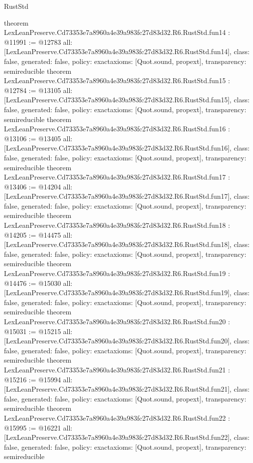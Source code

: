 \begin{lexlean}{RustStd}
\begin{coremodule}
{}
theorem LexLeanPreserve.Cd73353e7a8960a4e39a983fc27d83d32.R6.RustStd.fun14 : @11991 := @12783 {
  all: [LexLeanPreserve.Cd73353e7a8960a4e39a983fc27d83d32.R6.RustStd.fun14],
  class: false,
  generated: false,
  policy: exact{axioms: [Quot.sound, propext]},
  transparency: semireducible
}
theorem LexLeanPreserve.Cd73353e7a8960a4e39a983fc27d83d32.R6.RustStd.fun15 : @12784 := @13105 {
  all: [LexLeanPreserve.Cd73353e7a8960a4e39a983fc27d83d32.R6.RustStd.fun15],
  class: false,
  generated: false,
  policy: exact{axioms: [Quot.sound, propext]},
  transparency: semireducible
}
theorem LexLeanPreserve.Cd73353e7a8960a4e39a983fc27d83d32.R6.RustStd.fun16 : @13106 := @13405 {
  all: [LexLeanPreserve.Cd73353e7a8960a4e39a983fc27d83d32.R6.RustStd.fun16],
  class: false,
  generated: false,
  policy: exact{axioms: [Quot.sound, propext]},
  transparency: semireducible
}
theorem LexLeanPreserve.Cd73353e7a8960a4e39a983fc27d83d32.R6.RustStd.fun17 : @13406 := @14204 {
  all: [LexLeanPreserve.Cd73353e7a8960a4e39a983fc27d83d32.R6.RustStd.fun17],
  class: false,
  generated: false,
  policy: exact{axioms: [Quot.sound, propext]},
  transparency: semireducible
}
theorem LexLeanPreserve.Cd73353e7a8960a4e39a983fc27d83d32.R6.RustStd.fun18 : @14205 := @14475 {
  all: [LexLeanPreserve.Cd73353e7a8960a4e39a983fc27d83d32.R6.RustStd.fun18],
  class: false,
  generated: false,
  policy: exact{axioms: [Quot.sound, propext]},
  transparency: semireducible
}
theorem LexLeanPreserve.Cd73353e7a8960a4e39a983fc27d83d32.R6.RustStd.fun19 : @14476 := @15030 {
  all: [LexLeanPreserve.Cd73353e7a8960a4e39a983fc27d83d32.R6.RustStd.fun19],
  class: false,
  generated: false,
  policy: exact{axioms: [Quot.sound, propext]},
  transparency: semireducible
}
theorem LexLeanPreserve.Cd73353e7a8960a4e39a983fc27d83d32.R6.RustStd.fun20 : @15031 := @15215 {
  all: [LexLeanPreserve.Cd73353e7a8960a4e39a983fc27d83d32.R6.RustStd.fun20],
  class: false,
  generated: false,
  policy: exact{axioms: [Quot.sound, propext]},
  transparency: semireducible
}
theorem LexLeanPreserve.Cd73353e7a8960a4e39a983fc27d83d32.R6.RustStd.fun21 : @15216 := @15994 {
  all: [LexLeanPreserve.Cd73353e7a8960a4e39a983fc27d83d32.R6.RustStd.fun21],
  class: false,
  generated: false,
  policy: exact{axioms: [Quot.sound, propext]},
  transparency: semireducible
}
theorem LexLeanPreserve.Cd73353e7a8960a4e39a983fc27d83d32.R6.RustStd.fun22 : @15995 := @16221 {
  all: [LexLeanPreserve.Cd73353e7a8960a4e39a983fc27d83d32.R6.RustStd.fun22],
  class: false,
  generated: false,
  policy: exact{axioms: [Quot.sound, propext]},
  transparency: semireducible
}
\end{coremodule}
\end{lexlean}
